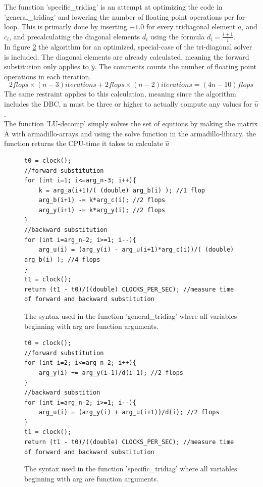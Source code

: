 \documentclass[11pt,a4paper,notitlepage]{article}
\begin{document}
	The function 'specific\_tridiag' is an attempt at optimizing the code in 'general\_tridiag' and lowering the  number of floating point operations per for-loop. This is primarly done by inserting $-1.0$ for every tridiagonal element $a_i$ and $c_i$, and precalculating the diagonal elements $d_i$ using the formula $d_i = \frac{i+1}{i}$. \\ %
	In figure \ref{code:specific_syntax} the algorithm for an optimized, special-case of the tri-diagonal solver is included. The diagonal elements are already calculated, meaning the forward substitution only applies to $\hat{y}$. The comments counts the number of floating point operations in each iteration. $$ 2flops\times(n-3)iterations + 2flops\times(n-2)iterations = (4n - 10)flops$$ The same restraint applies to this calculation, meaning since the algorithm includes the DBC, n must be three or higher to actually compute any values for $\hat{u}$. \\
	The function 'LU-decomp' simply solves the set of equtions by making the matrix A with armadillo-arrays and using the solve function in the armadillo-library. the function returns the CPU-time it takes to calculate $\hat{u}$
	
\begin{figure}
\label{code:general_syntax}
\lstset{style=c++style}
\begin{lstlisting}[frame=single]
t0 = clock();
//forward substitution
for (int i=1; i<=arg_n-3; i++){
    k = arg_a(i+1)/( (double) arg_b(i) ); //1 flop
    arg_b(i+1) -= k*arg_c(i); //2 flops
    arg_y(i+1) -= k*arg_y(i); //2 flops
}
//backward substitution
for (int i=arg_n-2; i>=1; i--){
  	arg_u(i) = (arg_y(i) - arg_u(i+1)*arg_c(i))/( (double) arg_b(i) ); //4 flops
}
t1 = clock();
return (t1 - t0)/((double) CLOCKS_PER_SEC); //measure time of forward and backward substitution
\end{lstlisting}
\caption{The syntax used in the function 'general\_tridiag' where all variables beginning with arg are function arguments.}
\end{figure}
	
\begin{figure}
\label{code:specific_syntax}
\lstset{style=c++style}
\begin{lstlisting}[frame=single]
t0 = clock();
//forward substitution
for (int i=2; i<=arg_n-2; i++){
	arg_y(i) += arg_y(i-1)/d(i-1); //2 flops
}
//backward substition
for (int i=arg_n-2; i>=1; i--){
    arg_u(i) = (arg_y(i) + arg_u(i+1))/d(i); //2 flops
}
t1 = clock();
return (t1 - t0)/((double) CLOCKS_PER_SEC); //measure time of forward and backward substitution
\end{lstlisting}
\caption{The syntax used in the function 'specific\_tridiag' where all variables beginning with arg are function arguments.}
\end{figure}
\end{document}
